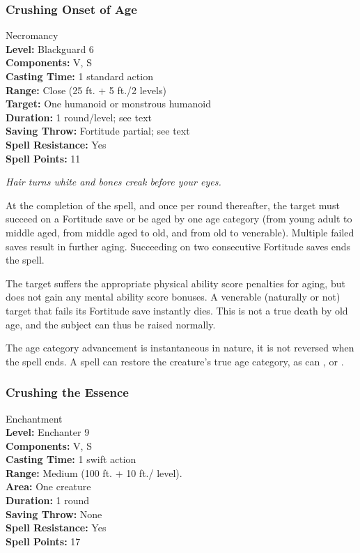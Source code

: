 \subsubsection{Crushing Onset of Age}
\label{Spell:CrushingOnsetOfAge}
Necromancy
\\ \textbf{Level:} Blackguard 6
\\ \textbf{Components:} V, S
\\ \textbf{Casting Time:} 1 standard action
\\ \textbf{Range:} Close (25 ft. + 5 ft./2 levels)
\\ \textbf{Target:} One humanoid or monstrous humanoid
\\ \textbf{Duration:} 1 round/level; see text
\\ \textbf{Saving Throw:} Fortitude partial; see text
\\ \textbf{Spell Resistance:} Yes
\\ \textbf{Spell Points:} 11

\emph{Hair turns white and bones creak before your eyes.}

At the completion of the spell, and once per round thereafter, the target must succeed on a Fortitude save or be aged by one age category (from young adult to middle aged, from middle aged to old, and from old to venerable). Multiple failed saves result in further aging. Succeeding on two consecutive Fortitude saves ends the spell.

The target suffers the appropriate physical ability score penalties for aging, but does not gain any mental ability score bonuses.
A venerable (naturally or not) target that fails its Fortitude save instantly dies. This is not a true death by old age, and the subject can thus be raised normally.

The age category advancement is instantaneous in nature, it is not reversed when the spell ends. A  spell can restore the creature's true age category, as can ,  or .
\subsubsection{Crushing the Essence}
\label{Spell:CrushingTheEssence}
Enchantment
\\ \textbf{Level:} Enchanter 9
\\ \textbf{Components:} V, S
\\ \textbf{Casting Time:} 1 swift action
\\ \textbf{Range:} Medium (100 ft. + 10 ft./ level).
\\ \textbf{Area:} One creature
\\ \textbf{Duration:} 1 round
\\ \textbf{Saving Throw:} None
\\ \textbf{Spell Resistance:} Yes
\\ \textbf{Spell Points:} 17

